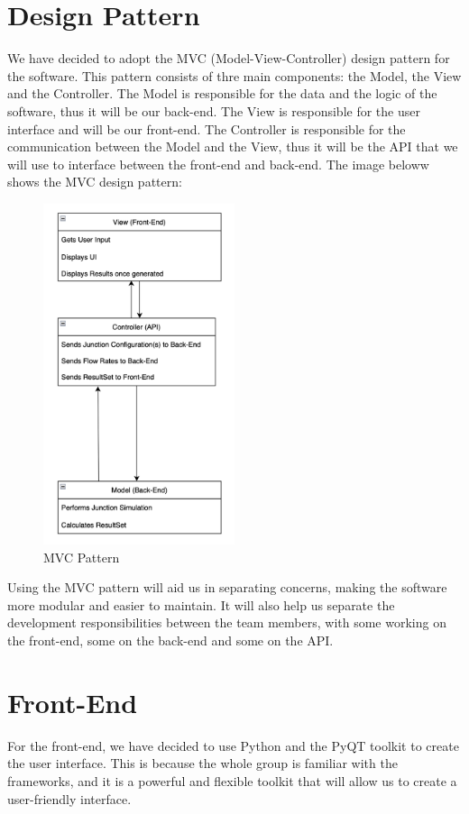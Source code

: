 \documentclass{article}
\begin{document}
\section{Design Pattern}
We have decided to adopt the MVC (Model-View-Controller) design pattern for the software. This pattern consists of thre main components: the Model, the View and the Controller.
The Model is responsible for the data and the logic of the software, thus it will be our back-end. The View is responsible for the user interface and will be our front-end. The Controller is responsible for the communication between the Model and the View, 
thus it will be the API that we will use to interface between the front-end and back-end. The image beloww shows the MVC design pattern:

\begin{figure}[H]
    \centering
    \includegraphics[width=0.5\textwidth]{pattern.png}
    \caption{MVC Pattern}
    \label{pattern}
\end{figure}

Using the MVC pattern will aid us in separating concerns, making the software more modular and easier to maintain. It will also help us separate the development responsibilities between the team members, with some working on the front-end, some on the back-end and some on the API.

\section{Front-End}
For the front-end, we have decided to use Python and the PyQT toolkit to create the user interface. This is because the whole group is familiar 
with the frameworks, and it is a powerful and flexible toolkit that will allow us to create a user-friendly interface.
\end{document}
